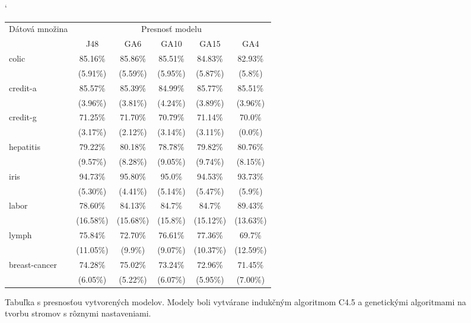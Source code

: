 \begin{figure}[h]
\catcode`
\centering 
\newcommand\T{\rule{0pt}{2.6ex}}       %
\newcommand\B{\rule[-1.2ex]{0pt}{0pt}} %
\begin{tabular}{|l||c|c|c|c|c||}
\hline \multirow{2}{*}{Dátová množina} & \multicolumn{5}{|c||}{Presnosť modelu} \\ 
\cline{2-6} & J48 & GA6 & GA10 & GA15 & GA4 \\
\hline
\hline \multirow{2}{*}{colic} & 85.16\% & 85.86\% & 85.51\% & 84.83\% & 82.93\% \T\\[-1.5ex]
& \tiny (5.91\%) & \tiny (5.59\%) & \tiny (5.95\%) & \tiny (5.87\%) & \tiny (5.8\%)\B\\
\hline \multirow{2}{*}{credit-a} & 85.57\% & 85.39\% & 84.99\% & 85.77\% & 85.51\% \T\\[-1.5ex]
& \tiny (3.96\%) & \tiny (3.81\%) & \tiny (4.24\%) & \tiny (3.89\%) & \tiny (3.96\%)\B\\
\hline \multirow{2}{*}{credit-g} & 71.25\% & 71.70\% & 70.79\% & 71.14\% & 70.0\%\T\\[-1.5ex]
& \tiny (3.17\%) & \tiny (2.12\%) & \tiny (3.14\%) & \tiny (3.11\%) & \tiny (0.0\%)\B\\
\hline \multirow{2}{*}{hepatitis} & 79.22\% & 80.18\% & 78.78\% & 79.82\% & 80.76\% \T\\[-1.5ex]
& \tiny (9.57\%) & \tiny (8.28\%) & \tiny (9.05\%) & \tiny (9.74\%) & \tiny (8.15\%)\B\\
\hline \multirow{2}{*}{iris} & 94.73\% & 95.80\% & 95.0\% & 94.53\% & 93.73\% \T\\[-1.5ex]
& \tiny (5.30\%) & \tiny (4.41\%) & \tiny (5.14\%) & \tiny (5.47\%) & \tiny (5.9\%)\B\\
\hline \multirow{2}{*}{labor} & 78.60\% & 84.13\% & 84.7\% & 84.7\% & 89.43\% \T\\[-1.5ex]
& \tiny (16.58\%) & \tiny (15.68\%) & \tiny (15.8\%) & \tiny (15.12\%) & \tiny (13.63\%)\B\\
\hline \multirow{2}{*}{lymph} & 75.84\% & 72.70\% & 76.61\% & 77.36\% & 69.7\% \T\\[-1.5ex]
& \tiny (11.05\%) & \tiny (9.9\%) & \tiny (9.07\%) & \tiny (10.37\%) & \tiny (12.59\%)\B\\
\hline \multirow{2}{*}{breast-cancer} & 74.28\% & 75.02\% & 73.24\% & 72.96\% & 71.45\% \T\\[-1.5ex]
& \tiny (6.05\%) & \tiny (5.22\%) & \tiny (6.07\%) & \tiny (5.95\%) & \tiny (7.00\%)\B\\
\hline
\end{tabular}
\caption{Tabuľka s presnosťou vytvorených modelov. Modely boli vytvárane indukčným algoritmom C4.5 a genetickými algoritmami na tvorbu stromov s rôznymi nastaveniami. }\label{fig:acc}
\end{figure}

